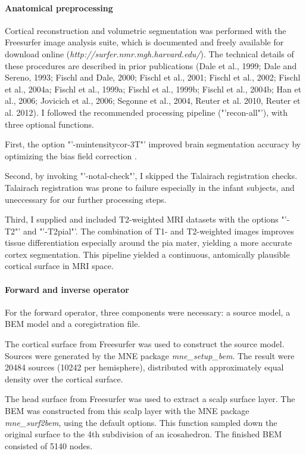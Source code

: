 \paragraph{Anatomical preprocessing}
Cortical reconstruction and volumetric segmentation was performed with the Freesurfer image analysis suite, which is documented and freely available for download online (\emph{http://surfer.nmr.mgh.harvard.edu/}).
The technical details of these procedures are described in prior publications (Dale et al., 1999; Dale and Sereno, 1993; Fischl and Dale, 2000; Fischl et al., 2001; Fischl et al., 2002; Fischl et al., 2004a; Fischl et al., 1999a; Fischl et al., 1999b; Fischl et al., 2004b; Han et al., 2006; Jovicich et al., 2006; Segonne et al., 2004, Reuter et al. 2010, Reuter et al. 2012).
I followed the recommended processing pipeline ("'recon-all"'), with three optional functions.

First, the option "'-nuintensitycor-3T"' improved brain segmentation accuracy by optimizing the bias field correction \cite{3.3.nuintensity}.

Second, by invoking "'-notal-check"', I skipped the Talairach registration checks.
Talairach registration was prone to failure especially in the infant subjects, and uneccessary for our further processing steps.

Third, I supplied and included T2-weighted MRI datasets with the options "'-T2"' and "'-T2pial"'.
The combination of T1- and T2-weighted images improves tissue differentiation especially around the pia mater, yielding a more accurate cortex segmentation.
This pipeline yielded a continuous, antomically plausible cortical surface in MRI space.


\paragraph{Forward and inverse operator}
For the forward operator, three components were necessary: a source model, a BEM model and a coregistration file.

The cortical surface from Freesurfer was used to construct the source model.
Sources were generated by the MNE package \emph{mne\_setup\_bem}.
The result were 20484 sources (10242 per hemisphere), distributed with approximately equal density over the cortical surface.

The head surface from Freesurfer was used to extract a scalp surface layer.
The BEM was constructed from this scalp layer with the MNE package \emph{mne\_surf2bem}, using the default options.
This function sampled down the original surface to the 4th subdivision of an icosahedron.
The finished BEM consisted of 5140 nodes.

